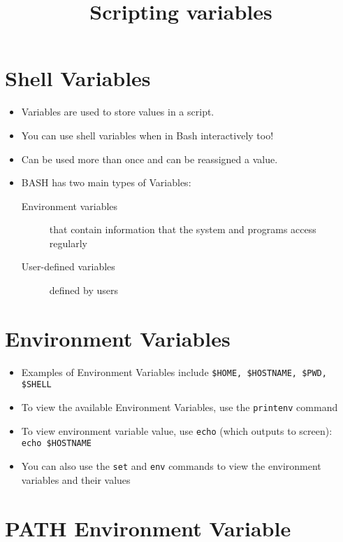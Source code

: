 \documentclass[slides]{pgnotes}
\title{Scripting variables}
\begin{document}
\maketitle

\tableofcontents

\section{Shell Variables}\label{shell-variables}

\begin{itemize}
  
\item
  Variables are used to store values in a script.
\item
  You can use shell variables when in Bash interactively too!
\item
  Can be used more than once and can be reassigned a value.
\item
  BASH has two main types of Variables:
  \begin{description}
  \item[Environment variables] that contain information that the system and programs access regularly
  \item[User-defined variables] defined by users 
  \end{description}
\end{itemize}


\section{Environment Variables}\label{environment-variables}

\begin{itemize}

\item
  Examples of Environment Variables include \texttt{\$HOME, \$HOSTNAME, \$PWD, \$SHELL}
\item
  To view the available Environment Variables, use the \texttt{printenv} command
\item
  To view environment variable value, use \texttt{echo} (which outputs to screen):\\
  \texttt{echo \$HOSTNAME}
\item
  You can also use the \texttt{set} and \texttt{env} commands to view the environment variables and their values
\end{itemize}

\section{PATH Environment Variable}\label{path-environment-variable}
\end{document}
